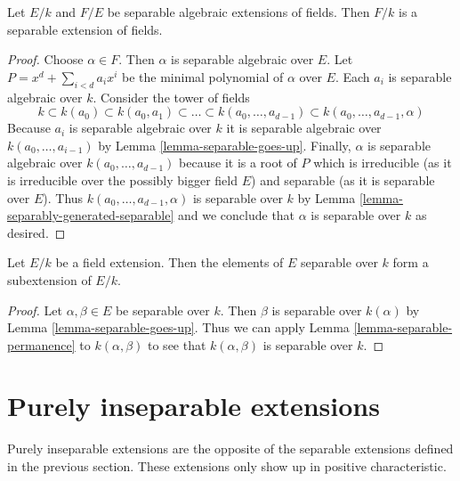 \begin{lemma}
\label{lemma-separable-permanence}
Let $E/k$ and $F/E$ be separable algebraic extensions of fields. Then $F/k$
is a separable extension of fields.
\end{lemma}

\begin{proof}
Choose $\alpha \in F$. Then $\alpha$ is separable algebraic over $E$.
Let $P = x^d + \sum_{i < d} a_i x^i$ be the minimal polynomial of
$\alpha$ over $E$. Each $a_i$ is separable algebraic over $k$.
Consider the tower of fields
$$
k \subset k(a_0) \subset k(a_0, a_1) \subset \ldots \subset
k(a_0, \ldots, a_{d - 1}) \subset k(a_0, \ldots, a_{d - 1}, \alpha)
$$
Because $a_i$ is separable algebraic over $k$ it is separable algebraic
over $k(a_0, \ldots, a_{i - 1})$ by Lemma \ref{lemma-separable-goes-up}.
Finally, $\alpha$ is separable algebraic over $k(a_0, \ldots, a_{d - 1})$
because it is a root of $P$ which is irreducible
(as it is irreducible over the possibly bigger field $E$)
and separable (as it is separable over $E$).
Thus $k(a_0, \ldots, a_{d - 1}, \alpha)$ is separable over $k$
by Lemma \ref{lemma-separably-generated-separable}
and we conclude that $\alpha$ is separable over $k$ as desired.
\end{proof}

\begin{lemma}
\label{lemma-separable-elements}
Let $E/k$ be a field extension. Then the elements of $E$ separable
over $k$ form a subextension of $E/k$.
\end{lemma}

\begin{proof}
Let $\alpha, \beta \in E$ be separable over $k$. Then $\beta$ is separable
over $k(\alpha)$ by Lemma \ref{lemma-separable-goes-up}.
Thus we can apply Lemma \ref{lemma-separable-permanence} to $k(\alpha, \beta)$
to see that $k(\alpha, \beta)$ is separable over $k$.
\end{proof}






\section{Purely inseparable extensions}
\label{section-purely-inseparable}

\noindent
Purely inseparable extensions are the opposite of the separable
extensions defined in the previous section. These extensions only
show up in positive characteristic.

